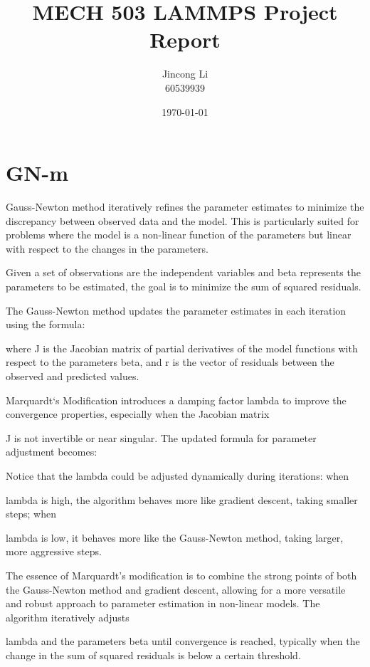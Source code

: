 \documentclass[17pt]{extarticle} %
\begin{document}
\setlength{\parskip}{1em} 
\setlength{\parindent}{0pt}
\newcommand{\vect}[1]{\mathbf{#1}}

\title{MECH 503 LAMMPS Project Report}
\author{Jincong Li \\ 60539939}
\date{\today}
\maketitle

\section*{GN-m}

Gauss-Newton method iteratively refines the parameter estimates to minimize the discrepancy between observed data and the model. 
This is particularly suited for problems where the model is a non-linear function of the parameters but linear with respect to 
the changes in the parameters.

Given a set of observations are the independent variables and beta represents the parameters to be estimated, the 
goal is to minimize the sum of squared residuals.

The Gauss-Newton method updates the parameter estimates in each iteration using the formula:

where J is the Jacobian matrix of partial derivatives of the model functions with respect to the parameters 
beta, and r is the vector of residuals between the observed and predicted values.

Marquardt`s Modification introduces a damping factor lambda to improve the convergence properties, especially when the Jacobian matrix 

J is not invertible or near singular. The updated formula for parameter adjustment becomes:

Notice that the lambda could be adjusted dynamically during iterations: when 

lambda is high, the algorithm behaves more like gradient descent, taking smaller steps; when 

lambda is low, it behaves more like the Gauss-Newton method, taking larger, more aggressive steps.

The essence of Marquardt's modification is to combine the strong points of both the Gauss-Newton method and gradient descent, allowing for a more versatile and robust approach to parameter estimation in non-linear models. The algorithm iteratively adjusts 

lambda and the parameters beta until convergence is reached, typically when the change in the sum of squared residuals is below a certain threshold.
\end{document}
